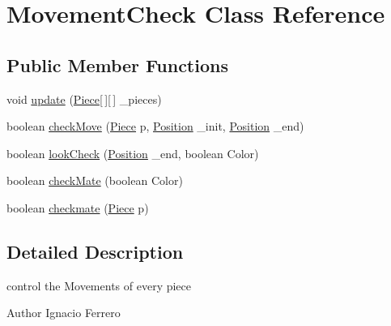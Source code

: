 \hypertarget{class_movement_check}{\section{Movement\-Check Class Reference}
\label{class_movement_check}
}
\subsection*{Public Member Functions}
\begin{DoxyCompactItemize}
\item 
void \hyperlink{class_movement_check_ad4282505567223574aad557238ec3962}{update} (\hyperlink{class_basic___objects_1_1_piece}{Piece}\mbox{[}$\,$\mbox{]}\mbox{[}$\,$\mbox{]} \-\_\-pieces)
\item 
boolean \hyperlink{class_movement_check_a7de16c5e5e34bea53f45a84c0357b3cf}{check\-Move} (\hyperlink{class_basic___objects_1_1_piece}{Piece} p, \hyperlink{class_basic___objects_1_1_position}{Position} \-\_\-init, \hyperlink{class_basic___objects_1_1_position}{Position} \-\_\-end)
\item 
boolean \hyperlink{class_movement_check_af22211846bb45340a2551f9c37fee143}{look\-Check} (\hyperlink{class_basic___objects_1_1_position}{Position} \-\_\-end, boolean Color)
\item 
boolean \hyperlink{class_movement_check_a6f044b7c75dd4d54dc1253937e885c6a}{check\-Mate} (boolean Color)
\item 
boolean \hyperlink{class_movement_check_a811aec4024622cc6cb153594a11b8afb}{checkmate} (\hyperlink{class_basic___objects_1_1_piece}{Piece} p)
\end{DoxyCompactItemize}


\subsection{Detailed Description}
control the Movements of every piece \begin{DoxyAuthor}{Author}
Ignacio Ferrero 
\end{DoxyAuthor}


